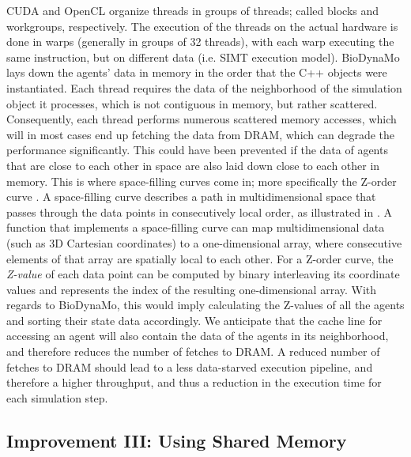 \documentclass[conference]{IEEEtran}
\begin{document}
\par CUDA and OpenCL organize threads in groups of threads; called blocks and workgroups, respectively.
The execution of the threads on the actual hardware is done in warps (generally in groups of 32 threads), with each warp executing the same instruction, but on different data (i.e. SIMT execution model).
BioDynaMo lays down the agents' data in memory in the order that the C++ objects were instantiated.
Each thread requires the data of the neighborhood of the simulation object it processes, which is not contiguous in memory, but rather scattered.
Consequently, each thread performs numerous scattered memory accesses, which will in most cases end up fetching the data from DRAM, which can degrade the performance significantly.
This could have been prevented if the data of agents that are close to each other in space are also laid down close to each other in memory.
This is where space-filling curves come in; more specifically the Z-order curve \cite{morton1966computer}.
A space-filling curve describes a path in multidimensional space that passes through the data points in consecutively local order, as illustrated in .
A function that implements a space-filling curve can map multidimensional data (such as 3D Cartesian coordinates) to a one-dimensional array, where consecutive elements of that array are spatially local to each other.
For a Z-order curve, the \textit{Z-value} of each data point can be computed by binary interleaving its coordinate values and represents the index of the resulting one-dimensional array.
With regards to BioDynaMo, this would imply calculating the Z-values of all the agents and sorting their state data accordingly.
We anticipate that the cache line for accessing an agent will also contain the data of the agents in its neighborhood, and therefore reduces the number of fetches to DRAM.
A reduced number of fetches to DRAM should lead to a less data-starved execution pipeline, and therefore a higher throughput, and thus a reduction in the execution time for each simulation step.

\subsection{Improvement III: Using Shared Memory}
\label{ssec:gpu_improvement4}
\end{document}
